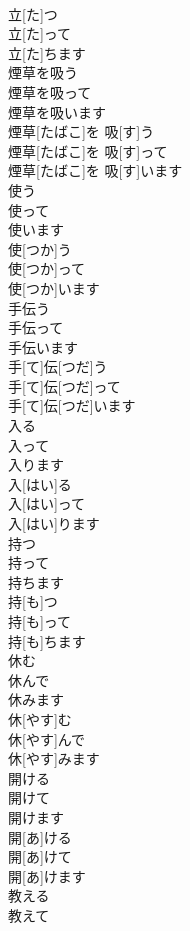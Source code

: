 \documentclass[8pt]{extreport}
\begin{document}
\begin{CJK}{UTF8}{min}
\\	立[た]つ 
\\	立[た]って 
\\	立[た]ちます	
\\	煙草を吸う 
\\	煙草を吸って 
\\	煙草を吸います	
\\	煙草[たばこ]を 吸[す]う 
\\	煙草[たばこ]を 吸[す]って 
\\	煙草[たばこ]を 吸[す]います	
\\	使う 
\\	使って 
\\	使います	
\\	使[つか]う 
\\	使[つか]って 
\\	使[つか]います	
\\	手伝う 
\\	手伝って 
\\	手伝います	
\\	手[て]伝[つだ]う 
\\	手[て]伝[つだ]って 
\\	手[て]伝[つだ]います	
\\	入る 
\\	入って 
\\	入ります	
\\	入[はい]る 
\\	入[はい]って 
\\	入[はい]ります	
\\	持つ 
\\	持って 
\\	持ちます	
\\	持[も]つ 
\\	持[も]って 
\\	持[も]ちます	
\\	休む 
\\	休んで 
\\	休みます	
\\	休[やす]む 
\\	休[やす]んで 
\\	休[やす]みます	
\\	開ける 
\\	開けて 
\\	開けます	
\\	開[あ]ける 
\\	開[あ]けて 
\\	開[あ]けます	
\\	教える 
\\	教えて 

\end{CJK}
\end{document}
